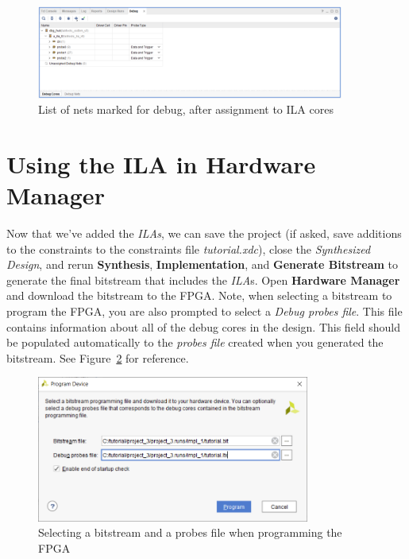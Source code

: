 \documentclass[11pt]{article}
\begin{document}
\begin{figure}[!h]
    \centering
    \includegraphics[width=0.9\textwidth]{images/debug_list2.png}
    \caption{List of nets marked for debug, after assignment to ILA cores}
    \label{fig:debug_list2}
\end{figure}




\section{Using the ILA in Hardware Manager}
\label{sec:hw_man}
Now that we've added the \textit{ILAs}, we can save the project (if asked, save additions to the constraints to the constraints file \textit{tutorial.xdc}), close the \textit{Synthesized Design}, and rerun \textbf{Synthesis}, \textbf{Implementation}, and \textbf{Generate Bitstream} to generate the final bitstream that includes the \textit{ILA}s. Open \textbf{Hardware Manager} and download the bitstream to the FPGA. Note, when selecting a bitstream to program the FPGA, you are also prompted to select a \textit{Debug probes file}. This file contains information about all of the debug cores in the design. This field should be populated automatically to the \textit{probes file} created when you generated the bitstream. See Figure~\ref{fig:select_bit} for reference.

\begin{figure}[!h]
    \centering
    \includegraphics[width=0.8\textwidth]{images/select_bit.png}
    \caption{Selecting a bitstream and a probes file when programming the FPGA}
    \label{fig:select_bit}
\end{figure}
\end{document}
